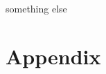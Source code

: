 \documentclass{article}
\begin{document}
\begin{titlepage}
    
\end{titlepage}










something else\cite{something}

\printbibliography[title={Bibliografia}]

\section*{Appendix}
\end{document}
